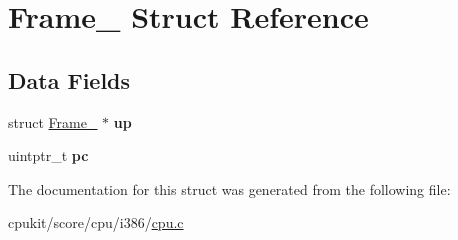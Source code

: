 \hypertarget{structFrame__}{}\section{Frame\+\_\+ Struct Reference}
\label{structFrame__}
\subsection*{Data Fields}
\begin{DoxyCompactItemize}
\item 
\mbox{\label{structFrame___a099e1eb7e3bdad9d0f108b16bf652c0d}} 
struct \mbox{\hyperlink{structFrame__}{Frame\+\_\+}} $\ast$ {\bfseries up}
\item 
\mbox{\label{structFrame___a70e558507c744a3251f3a88f66c235e5}} 
uintptr\+\_\+t {\bfseries pc}
\end{DoxyCompactItemize}


The documentation for this struct was generated from the following file\+:\begin{DoxyCompactItemize}
\item 
cpukit/score/cpu/i386/\mbox{\hyperlink{cpukit_2score_2cpu_2i386_2cpu_8c}{cpu.\+c}}\end{DoxyCompactItemize}
